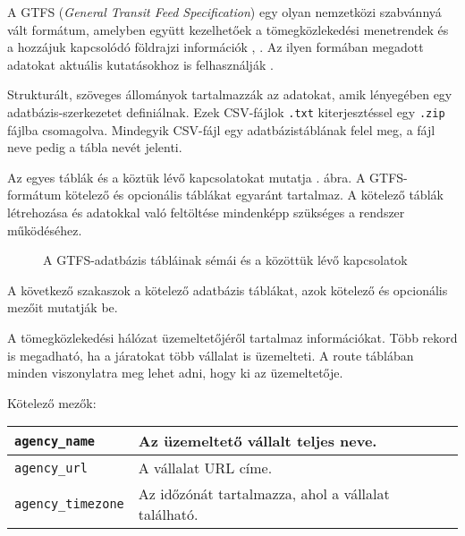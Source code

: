 
A GTFS (\textit{General Transit Feed Specification}) egy olyan nemzetközi szabvánnyá vált formátum, amelyben együtt kezelhetőek a tömegközlekedési menetrendek és a hozzájuk kapcsolódó földrajzi információk \cite{gtfs}, \cite{gtfsspec}. Az ilyen formában megadott adatokat aktuális kutatásokhoz is felhasználják \cite{crowdsending}.

Strukturált, szöveges állományok tartalmazzák az adatokat, amik lényegében egy adatbázis-szerkezetet definiálnak. Ezek CSV-fájlok \texttt{.txt} kiterjesztéssel egy \texttt{.zip} fájlba csomagolva. Mindegyik CSV-fájl egy adatbázistáblának felel meg, a fájl neve pedig a tábla nevét jelenti.

Az egyes táblák és a köztük lévő kapcsolatokat mutatja . ábra. A GTFS-formátum kötelező és opcionális táblákat egyaránt tartalmaz. A kötelező táblák létrehozása és adatokkal való feltöltése mindenképp szükséges a rendszer működéséhez.


\begin{figure}
\centering

\caption{A GTFS-adatbázis tábláinak sémái és a közöttük lévő kapcsolatok}
\label{fig:gtfs}
\end{figure}


A következő szakaszok a kötelező adatbázis táblákat, azok kötelező és opcionális mezőit mutatják be.


A tömegközlekedési hálózat üzemeltetőjéről tartalmaz információkat. Több rekord is megadható, ha a járatokat több vállalat is üzemelteti. A route táblában minden viszonylatra meg lehet adni, hogy ki az üzemeltetője.

\medskip

\noindent Kötelező mezők:

\bigskip

\begin{tabular}{|p{3.5cm}|p{10cm}|}
\hline
\texttt{agency\_name} & Az üzemeltető vállalt teljes neve. \\
\hline
\texttt{agency\_url} & A vállalat URL címe. \\
\hline
\texttt{agency\_timezone} & Az időzónát tartalmazza, ahol a vállalat található. \\
\hline
\end{tabular}

